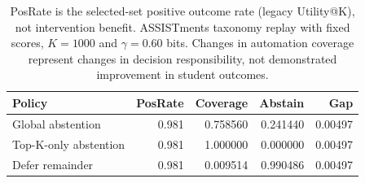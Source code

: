 \begin{table}[t]
\centering
\small
\caption{PosRate is the selected-set positive outcome rate (legacy Utility@K), not intervention benefit. ASSISTments taxonomy replay with fixed scores, $K=1000$ and $\gamma=0.60$ bits. Changes in automation coverage represent changes in decision responsibility, not demonstrated improvement in student outcomes.}
\label{tab:policy-replay}
\begin{tabular}{lrrrr}
\toprule
Policy & PosRate & Coverage & Abstain & Gap \\
\midrule
Global abstention & 0.981 & 0.758560 & 0.241440 & 0.00497 \\
Top-K-only abstention & 0.981 & 1.000000 & 0.000000 & 0.00497 \\
Defer remainder & 0.981 & 0.009514 & 0.990486 & 0.00497 \\
\bottomrule
\end{tabular}
\end{table}
